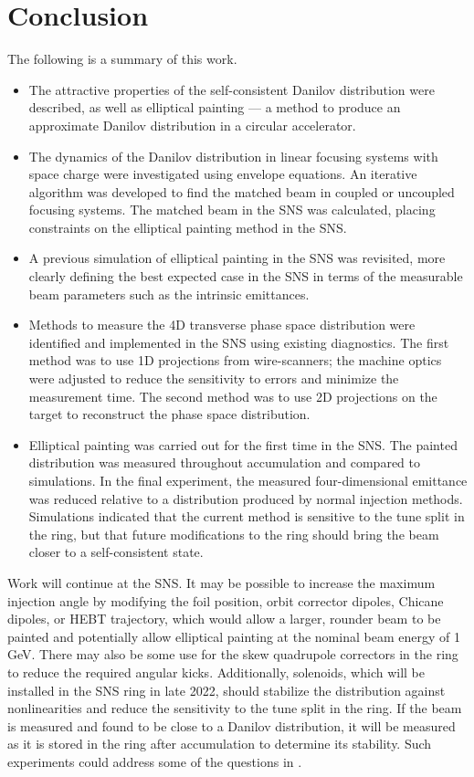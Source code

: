 \chapter{Conclusion} \label{chap-6}

The following is a summary of this work.
%
\begin{itemize}
    \item The attractive properties of the self-consistent Danilov distribution were described, as well as elliptical painting — a method to produce an approximate Danilov distribution in a circular accelerator.
    \item The dynamics of the Danilov distribution in linear focusing systems with space charge were investigated using envelope equations. An iterative algorithm was developed to find the matched beam in coupled or uncoupled focusing systems. The matched beam in the SNS was calculated, placing constraints on the elliptical painting method in the SNS. 
    \item A previous simulation of elliptical painting in the SNS was revisited, more clearly defining the best expected case in the SNS in terms of the measurable beam parameters such as the intrinsic emittances.
    \item Methods to measure the 4D transverse phase space distribution were identified and implemented in the SNS using existing diagnostics. The first method was to use 1D projections from wire-scanners; the machine optics were adjusted to reduce the sensitivity to errors and minimize the measurement time. The second method was to use 2D projections on the target to reconstruct the phase space distribution. 
    \item Elliptical painting was carried out for the first time in the SNS. The painted distribution was measured throughout accumulation and compared to simulations. In the final experiment, the measured four-dimensional emittance was reduced relative to a distribution produced by normal injection methods. Simulations indicated that the current method is sensitive to the tune split in the ring, but that future modifications to the ring should bring the beam closer to a self-consistent state.
\end{itemize}
%

Work will continue at the SNS. It may be possible to increase the maximum injection angle by modifying the foil position, orbit corrector dipoles, Chicane dipoles, or HEBT trajectory, which would allow a larger, rounder beam to be painted and potentially allow elliptical painting at the nominal beam energy of 1 GeV. There may also be some use for the skew quadrupole correctors in the ring to reduce the required angular kicks. Additionally, solenoids, which will be installed in the SNS ring in late 2022, should stabilize the distribution against nonlinearities and reduce the sensitivity to the tune split in the ring. If the beam is measured and found to be close to a Danilov distribution, it will be measured as it is stored in the ring after accumulation to determine its stability. Such experiments could address some of the questions in \cite{Burov2013}.

